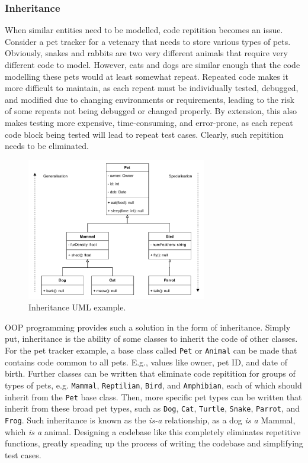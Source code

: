 \documentclass[11pt]{article}
\begin{document}
\subsubsection{Inheritance}

When similar entities need to be modelled, code repitition becomes an issue. Consider a pet tracker for a vetenary that needs to store various types of pets. Obviously, snakes and rabbits are two very different animals that require very different code to model. However, cats and dogs are similar enough that the code modelling these pets would at least somewhat repeat. Repeated code makes it more difficult to maintain, as each repeat must be individually tested, debugged, and modified due to changing environments or requirements, leading to the risk of some repeats not being debugged or changed properly. By extension, this also makes testing more expensive, time-consuming, and error-prone, as each repeat code block being tested will lead to repeat test cases. Clearly, such repitition needs to be eliminated.

\begin{figure}[b!]
    \centering
    \includegraphics[width=0.7\textwidth]{figures/inheritance.pdf}
    \caption{Inheritance UML example.}
    \label{fig:inheritance-uml}
\end{figure}

OOP programming provides such a solution in the form of inheritance. Simply put, inheritance is the ability of some classes to inherit the code of other classes. For the pet tracker example, a base class called \texttt{Pet} or \texttt{Animal} can be made that contains code common to all pets. E.g., values like owner, pet ID, and date of birth. Further classes can be written that eliminate code repitition for groups of types of pets, e.g. \texttt{Mammal}, \texttt{Reptilian}, \texttt{Bird}, and \texttt{Amphibian}, each of which should inherit from the \texttt{Pet} base class. Then, more specific pet types can be written that inherit from these broad pet types, such as \texttt{Dog}, \texttt{Cat}, \texttt{Turtle}, \texttt{Snake}, \texttt{Parrot}, and \texttt{Frog}. Such inheritance is known as the \textit{is-a} relationship, as a dog \textit{is a} Mammal, which \textit{is a} animal. Designing a codebase like this completely eliminates repetitive functions, greatly speading up the process of writing the codebase and simplifying test cases.
\end{document}
